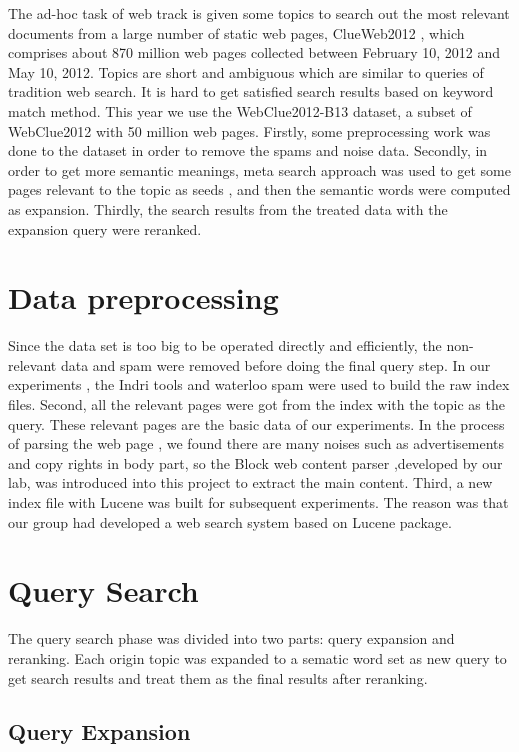 \documentclass[runningheads,a4paper]{llncs}
\begin{document}
The ad-hoc task of web track is given some topics to search out the most relevant documents from a large number of static web pages, ClueWeb2012 \cite{clueweb2012}, which comprises about 870 million web pages collected between February 10, 2012 and May 10, 2012. Topics are short and ambiguous which are similar to queries of tradition web search. It is hard to get satisfied search results based on keyword match method. This year we use the WebClue2012-B13 dataset, a subset of WebClue2012 with 50 million web pages. Firstly, some preprocessing work was done to the dataset in order to remove the spams and noise data. Secondly, in order to get more semantic meanings, meta search approach was used to get some pages relevant to the topic as seeds , and then the semantic words were computed as expansion. Thirdly, the search results from the treated data with the expansion query were reranked. 

\section{Data preprocessing}

Since the data set is too big to be operated directly and efficiently, the non-relevant  data and spam were removed before doing the final query step. In our experiments , the Indri \cite{indri} tools and waterloo spam \cite{2011-Cormack-p441-465} were used to build the raw index files. Second, all the relevant pages were got from the index with the topic as the query. These relevant pages are the basic data of our experiments. In the process of parsing the web page , we found there are many noises such as advertisements and copy rights in body part, so the Block web content parser \cite{2012-Lin-p256-264} ,developed by our lab, was introduced into this project to extract the main content. Third, a new index file with Lucene \cite{lucene} was built for subsequent experiments.  The reason was that our group had developed a web search system based on Lucene package.

\section{Query Search}

The query search phase was divided into two parts: query expansion and reranking. Each origin topic was expanded to a sematic word set as new query to get search results and treat them as the final results after reranking. 

\subsection{Query Expansion }
\end{document}
